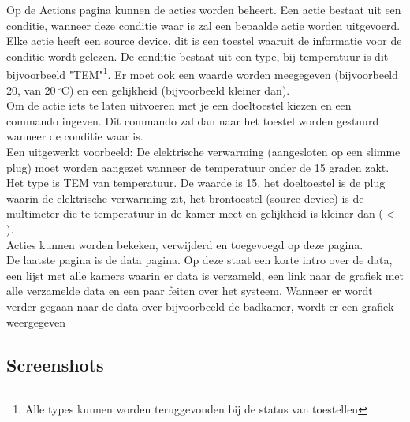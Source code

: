 \documentclass{article}
\begin{document}
Op de Actions pagina kunnen de acties worden beheert. Een actie bestaat uit een conditie, wanneer deze conditie waar is zal een bepaalde actie worden uitgevoerd. Elke actie heeft een source device, dit is een toestel waaruit de informatie voor de conditie wordt gelezen. De conditie bestaat uit een type, bij temperatuur is dit bijvoorbeeld "TEM"\footnote{Alle types kunnen worden teruggevonden bij de status van toestellen}. Er moet ook een waarde worden meegegeven (bijvoorbeeld 20, van $20\,^{\circ}\mathrm{C}$) en een gelijkheid (bijvoorbeeld kleiner dan).\\
Om de actie iets te laten uitvoeren met je een doeltoestel kiezen en een commando ingeven. Dit commando zal dan naar het toestel worden gestuurd wanneer de conditie waar is.\\
Een uitgewerkt voorbeeld: De elektrische verwarming (aangesloten op een slimme plug) moet worden aangezet wanneer de temperatuur onder de 15 graden zakt. Het type is TEM van temperatuur. De waarde is 15, het doeltoestel is de plug waarin de elektrische verwarming zit, het brontoestel (source device) is de multimeter die te temperatuur in de kamer meet en gelijkheid is kleiner dan ($<$).\\
Acties kunnen worden bekeken, verwijderd en toegevoegd op deze pagina.\\

De laatste pagina is de data pagina. Op deze staat een korte intro over de data, een lijst met alle kamers waarin er data is verzameld, een link naar de grafiek met alle verzamelde data en een paar feiten over het systeem. Wanneer er wordt verder gegaan naar de data over bijvoorbeeld de badkamer, wordt er een grafiek weergegeven 


\subsection{Screenshots}
\label{sub:screenshots}


\end{document}
